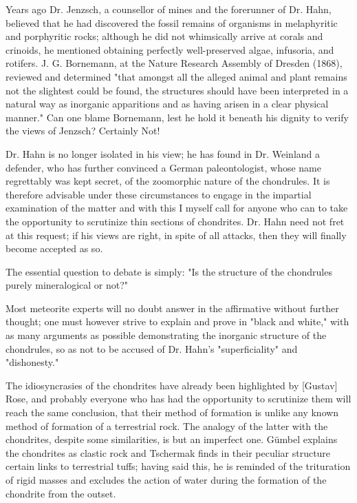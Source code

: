 \documentclass[a4paper, 12pt, oneside]{article}
\begin{document}
Years ago Dr. Jenzsch, a counsellor of mines and the forerunner of Dr. Hahn, believed that he had discovered the fossil remains of organisms in melaphyritic and porphyritic rocks; although he did not whimsically arrive at corals and crinoids, he mentioned obtaining perfectly well-preserved algae, infusoria, and rotifers. J. G. Bornemann, at the Nature Research Assembly of Dresden (1868), reviewed and determined "that amongst all the alleged animal and plant remains not the slightest could be found, the structures should have been interpreted in a natural way as inorganic apparitions and as having arisen in a clear physical manner." Can one blame Bornemann, lest he hold it beneath his dignity to verify the views of Jenzsch? Certainly Not!

Dr. Hahn is no longer isolated in his view; he has found in Dr. Weinland a defender, who has further convinced a German paleontologist, whose name regrettably was kept secret, of the zoomorphic nature of the chondrules. It is therefore advisable under these circumstances to engage in the impartial examination of the matter and with this I myself call for anyone who can to take the opportunity to scrutinize thin sections of chondrites. Dr. Hahn need not fret at this request; if his views are right, in spite of all attacks, then they will finally become accepted as so.

The essential question to debate is simply: "Is the structure of the chondrules purely mineralogical or not?"

Most meteorite experts will no doubt answer in the affirmative without further thought; one must however strive to explain and prove in "black and white," with as many arguments as possible demonstrating the inorganic structure of the chondrules, so as not to be accused of Dr. Hahn's "superficiality" and "dishonesty."

The idiosyncrasies of the chondrites have already been highlighted by [Gustav] Rose, and probably everyone who has had the opportunity to scrutinize them will reach the same conclusion, that their method of formation is unlike any known method of formation of a terrestrial rock. The analogy of the latter with the chondrites, despite some similarities, is but an imperfect one. Gümbel explains the chondrites as clastic rock and Tschermak finds in their peculiar structure certain links to terrestrial tuffs; having said this, he is reminded of the trituration of rigid masses and excludes the action of water during the formation of the chondrite from the outset.
\end{document}
